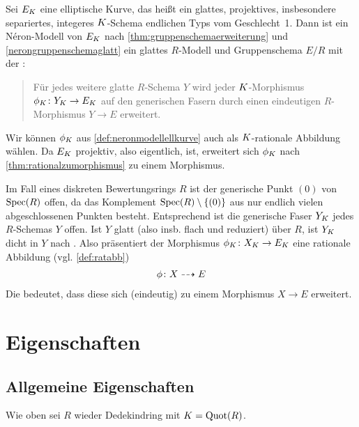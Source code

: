 
\begin{Bemerkung}
  \label{def:neronmodellellkurve}
  Sei $E_{K}$ eine elliptische Kurve, das heißt ein
  glattes, projektives, insbesondere separiertes, integeres
  $K$-Schema endlichen Typs vom Geschlecht~1.
  Dann ist ein Néron-Modell von $E_{K}$ nach
  \ref{thm:gruppenschemaerweiterung} und \ref{nerongruppenschemaglatt}
  ein glattes $R$-Modell und Gruppenschema $E/R$ mit der
  \NAbbEig:
  \begin{quote}
    Für jedes weitere glatte $R$-Schema $Y$ wird jeder
    $K$-Morphismus $\phi_{K}\colon Y_{K}\to E_{K}$ auf den generischen
    Fasern durch einen eindeutigen $R$-Morphismus $Y\to E$ erweitert.
  \end{quote}
\end{Bemerkung}
\begin{Bemerkung}\label{thm:dichtefaser}
  Wir können $\phi_{K}$ aus \ref{def:neronmodellellkurve} auch als
  $K$-rationale Abbildung wählen. Da $E_{K}$ projektiv, also eigentlich,
  ist, erweitert sich $\phi_{K}$ nach
  \ref{thm:rationalzumorphismus} zu einem Morphismus.

  Im Fall eines diskreten Bewertungsrings $R$ ist der generische Punkt
  $(0)$ von $\operatorname{Spec}(R)$ offen, da das Komplement
  $\operatorname{Spec}(R)\setminus\{(0)\}$ aus nur endlich vielen abgeschlossenen
  Punkten besteht. Entsprechend ist die generische Faser $Y_{K}$ jedes
  $R$-Schemas $Y$ offen.
  Ist $Y$ glatt (also insb. flach und reduziert) über $R$, ist $Y_{K}$
  dicht in $Y$ nach \cite[Proposition III.9.7]{hartshorne}.
  Also präsentiert der Morphismus $\phi_{K}\colon X_{K}\to E_{K}$ eine
  rationale Abbildung (vgl. \ref{def:ratabb})
  \begin{gather*}
    \phi\colon X\dashrightarrow E
  \end{gather*}
  Die \NAbbEig bedeutet, dass diese sich (eindeutig) zu einem
  Morphismus $X\to E$ erweitert.
\end{Bemerkung}


\section{Eigenschaften}
\subsection{Allgemeine Eigenschaften}
Wie oben sei $R$ wieder Dedekindring mit $K=\operatorname{Quot}(R)$.

